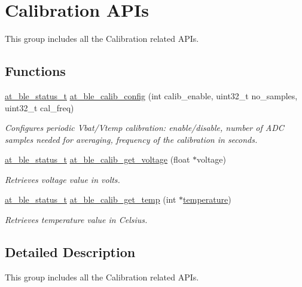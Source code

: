 \hypertarget{group__calib__group}{}\section{Calibration A\+P\+Is}
\label{group__calib__group}


This group includes all the Calibration related A\+P\+Is.  


\subsection*{Functions}
\begin{DoxyCompactItemize}
\item 
\mbox{\hyperlink{group__error__codes__group_ga3b1db9b95feb157b3c188ca27fe76988}{at\+\_\+ble\+\_\+status\+\_\+t}} \mbox{\hyperlink{group__calib__group_ga9ead57dad973b4c7ebe1e199e64356e7}{at\+\_\+ble\+\_\+calib\+\_\+config}} (int calib\+\_\+enable, uint32\+\_\+t no\+\_\+samples, uint32\+\_\+t cal\+\_\+freq)
\begin{DoxyCompactList}\small\item\em Configures periodic Vbat/\+Vtemp calibration\+: enable/disable, number of A\+DC samples needed for averaging, frequency of the calibration in seconds. \end{DoxyCompactList}\item 
\mbox{\hyperlink{group__error__codes__group_ga3b1db9b95feb157b3c188ca27fe76988}{at\+\_\+ble\+\_\+status\+\_\+t}} \mbox{\hyperlink{group__calib__group_gabbca0578e51667ffaf6f7027745991ee}{at\+\_\+ble\+\_\+calib\+\_\+get\+\_\+voltage}} (float $\ast$voltage)
\begin{DoxyCompactList}\small\item\em Retrieves voltage value in volts. \end{DoxyCompactList}\item 
\mbox{\hyperlink{group__error__codes__group_ga3b1db9b95feb157b3c188ca27fe76988}{at\+\_\+ble\+\_\+status\+\_\+t}} \mbox{\hyperlink{group__calib__group_ga5e41fece70f7b83cbdfb24773a4835f6}{at\+\_\+ble\+\_\+calib\+\_\+get\+\_\+temp}} (int $\ast$\mbox{\hyperlink{demotasks_8c_a189f4b74d9dd4e7561d76e58c28606cc}{temperature}})
\begin{DoxyCompactList}\small\item\em Retrieves temperature value in Celsius. \end{DoxyCompactList}\end{DoxyCompactItemize}


\subsection{Detailed Description}
This group includes all the Calibration related A\+P\+Is. 



